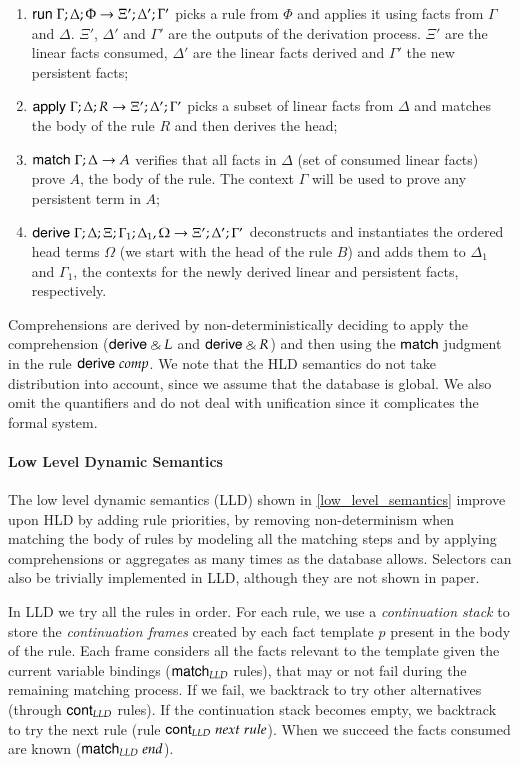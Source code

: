 \begin{enumerate}
   \item $\mathsf{run} \; \Gamma; \Delta; \Phi \rightarrow \Xi'; \Delta'; \Gamma'$ picks a rule from $\Phi$ and applies it using facts from $\Gamma$ and $\Delta$. $\Xi'$, $\Delta'$ and $\Gamma'$ are the outputs of the derivation process. $\Xi'$ are the linear facts consumed, $\Delta'$ are the linear facts derived and $\Gamma'$ the new persistent facts;
   \item $\mathsf{apply} \; \Gamma; \Delta; R \rightarrow \Xi'; \Delta'; \Gamma'$ picks a subset of linear facts from $\Delta$ and matches the body of the rule $R$ and then derives the head;
   \item $\mathsf{match} \; \Gamma; \Delta \rightarrow A$ verifies that all facts in $\Delta$ (set of consumed linear facts) prove $A$, the body of the rule. The context $\Gamma$ will be used to prove any persistent term in $A$;
   \item $\mathsf{derive} \; \Gamma; \Delta; \Xi; \Gamma_1; \Delta_1, \Omega \rightarrow \Xi'; \Delta'; \Gamma'$ deconstructs and instantiates the ordered head terms $\Omega$ (we start with the head of the rule $B$) and adds them to $\Delta_1$ and $\Gamma_1$, the contexts for the newly derived linear and persistent facts, respectively.
\end{enumerate}

Comprehensions are derived by non-deterministically deciding to apply the comprehension ($\mathsf{derive} \mathbin{\binampersand} L$ and $\mathsf{derive} \mathbin{\binampersand} R$)
and then using the $\mathsf{match} \;$judgment in the rule $\mathsf{derive} \; comp$. We note that the HLD semantics do not take distribution into account,
since we assume that the database is global. We also omit the quantifiers and do not deal with unification since it complicates the formal system.

\paragraph{Low Level Dynamic Semantics} The low level dynamic semantics (LLD) shown in \ref{low_level_semantics} improve upon HLD by adding rule priorities, by removing non-determinism
when matching the body of rules by modeling all the matching steps and by applying comprehensions or aggregates as many times as the database allows.
Selectors can also be trivially implemented in LLD, although they are not shown in paper.

In LLD we try all the rules in order. For each rule, we use a \emph{continuation stack} to store the \emph{continuation frames} created by
each fact template $p$ present
in the body of the rule. Each frame considers all the facts relevant to the template given the current variable bindings ($\mathsf{match}_{LLD} \;$rules), that
may or not fail during the remaining matching process. If we fail, we backtrack to try other alternatives (through $\mathsf{cont}_{LLD} \;$rules). If the
continuation stack becomes empty, we backtrack to try the next rule (rule $\mathsf{cont}_{LLD} \; next \; rule$). When we succeed the facts consumed are known
($\mathsf{match}_{LLD} \; end$).

